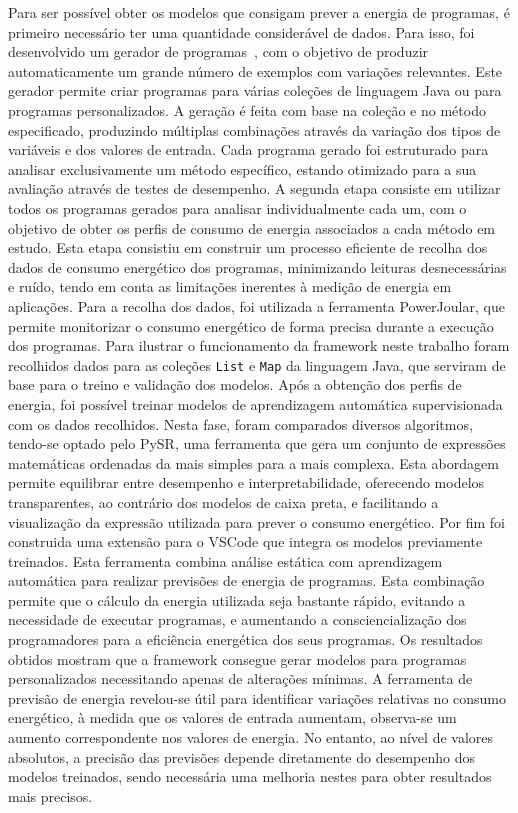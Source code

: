 Para ser possível obter os modelos que consigam prever a energia de programas, é primeiro necessário ter uma quantidade considerável de dados. Para isso, foi desenvolvido um gerador de programas~, com o objetivo de produzir automaticamente um grande número de exemplos com variações relevantes.
Este gerador permite criar programas para várias coleções de linguagem Java ou para programas personalizados. A geração é feita com base na coleção e no método especificado, produzindo múltiplas combinações através da variação dos tipos de variáveis e dos valores de entrada. Cada programa gerado foi estruturado para analisar exclusivamente um método específico, estando otimizado para a sua avaliação através de testes de desempenho.
A segunda etapa consiste em utilizar todos os programas gerados para analisar individualmente cada um, com o objetivo de obter os perfis de consumo de energia associados a cada método em estudo. Esta etapa consistiu em construir um processo eficiente de recolha dos dados de consumo energético dos programas, minimizando leituras desnecessárias e ruído, tendo em conta as limitações inerentes à medição de energia em aplicações. Para a recolha dos dados, foi utilizada a ferramenta PowerJoular, que permite monitorizar o consumo energético de forma precisa durante a execução dos programas.
Para ilustrar o funcionamento da framework neste trabalho foram recolhidos dados para as coleções \texttt{List} e \texttt{Map} da linguagem Java, que serviram de base para o treino e validação dos modelos.
Após a obtenção dos perfis de energia, foi possível treinar modelos de aprendizagem automática supervisionada com os dados recolhidos. Nesta fase, foram comparados diversos algoritmos, tendo-se optado pelo PySR, uma ferramenta que gera um conjunto de expressões matemáticas ordenadas da mais simples para a mais complexa. Esta abordagem permite equilibrar entre desempenho e interpretabilidade, oferecendo modelos transparentes, ao contrário dos modelos de caixa preta, e facilitando a visualização da expressão utilizada para prever o consumo energético.
Por fim foi construida uma extensão para o VSCode que integra os modelos previamente treinados. Esta ferramenta combina análise estática com aprendizagem automática para realizar previsões de energia de programas. Esta combinação permite que o cálculo da energia utilizada seja bastante rápido, evitando a necessidade de executar programas, e aumentando a consciencialização dos programadores para a eficiência energética dos seus programas.
Os resultados obtidos mostram que a framework consegue gerar modelos para programas personalizados necessitando apenas de alterações mínimas. A ferramenta de previsão de energia revelou-se útil para identificar variações relativas no consumo energético, à medida que os valores de entrada aumentam, observa-se um aumento correspondente nos valores de energia. No entanto, ao nível de valores absolutos, a precisão das previsões depende diretamente do desempenho dos modelos treinados, sendo necessária uma melhoria nestes para obter resultados mais precisos.

